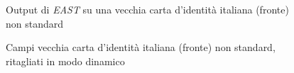 \begin{figure}[H]
	\centering
	\caption{Output di \textit{EAST} su una vecchia carta d'identit\`a italiana (fronte) non standard} \label{fig:car-f-example-east}
\end{figure}
\begin{figure}[H]
	\centering
	\caption{Campi vecchia carta d'identit\`a italiana (fronte) non standard, ritagliati in modo dinamico} \label{fig:car-f-dynamic}
\end{figure}

